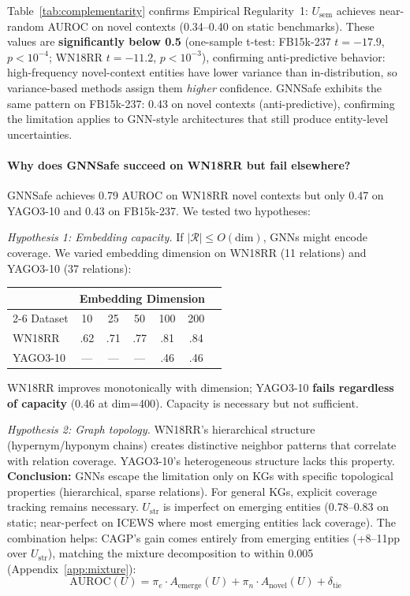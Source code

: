 Table~\ref{tab:complementarity} confirms Empirical Regularity~1: $U_{\text{sem}}$ achieves near-random AUROC on novel contexts (0.34--0.40 on static benchmarks). These values are \textbf{significantly below 0.5} (one-sample t-test: FB15k-237 $t{=}{-}17.9$, $p{<}10^{-4}$; WN18RR $t{=}{-}11.2$, $p{<}10^{-3}$), confirming anti-predictive behavior: high-frequency novel-context entities have lower variance than in-distribution, so variance-based methods assign them \emph{higher} confidence. GNNSafe exhibits the same pattern on FB15k-237: 0.43 on novel contexts (anti-predictive), confirming the limitation applies to GNN-style architectures that still produce entity-level uncertainties.

\paragraph{Why does GNNSafe succeed on WN18RR but fail elsewhere?}
GNNSafe achieves 0.79 AUROC on WN18RR novel contexts but only 0.47 on YAGO3-10 and 0.43 on FB15k-237. We tested two hypotheses:

\emph{Hypothesis 1: Embedding capacity.} If $|\mathcal{R}| \leq O(\text{dim})$, GNNs might encode coverage. We varied embedding dimension on WN18RR (11 relations) and YAGO3-10 (37 relations):

\begin{center}
\small
\begin{tabular}{lcccccc}
\toprule
& \multicolumn{5}{c}{Embedding Dimension} \\
\cmidrule(lr){2-6}
Dataset & 10 & 25 & 50 & 100 & 200 \\
\midrule
WN18RR & .62 & .71 & .77 & .81 & .84 \\
YAGO3-10 & --- & --- & --- & .46 & .46 \\
\bottomrule
\end{tabular}
\end{center}

WN18RR improves monotonically with dimension; YAGO3-10 \textbf{fails regardless of capacity} (0.46 at dim=400). Capacity is necessary but not sufficient.

\emph{Hypothesis 2: Graph topology.} WN18RR's hierarchical structure (hypernym/hyponym chains) creates distinctive neighbor patterns that correlate with relation coverage. YAGO3-10's heterogeneous structure lacks this property. \textbf{Conclusion:} GNNs escape the limitation only on KGs with specific topological properties (hierarchical, sparse relations). For general KGs, explicit coverage tracking remains necessary. $U_{\text{str}}$ is imperfect on emerging entities (0.78--0.83 on static; near-perfect on ICEWS where most emerging entities lack coverage). The combination helps: CAGP's gain comes entirely from emerging entities (+8--11pp over $U_{\text{str}}$), matching the mixture decomposition to within 0.005 (Appendix~\ref{app:mixture}):
\begin{equation}
\text{AUROC}(U) = \pi_e \cdot A_{\text{emerge}}(U) + \pi_n \cdot A_{\text{novel}}(U) + \delta_{\text{tie}}
\label{eq:mixture_auroc}
\end{equation}

